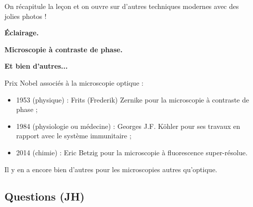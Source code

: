 On récapitule la leçon et on ouvre sur d'autres techniques modernes avec des jolies photos !

\begin{slide}
\textbf{Éclairage.}
\end{slide}

\begin{slide}
\textbf{Microscopie à contraste de phase.}
\end{slide}

\begin{slide}
\textbf{Et bien d'autres...}
\end{slide}

\begin{funfact}
Prix Nobel associés à la microscopie optique :
\begin{itemize}
\item 1953 (physique) : Frits (Frederik) Zernike pour la microscopie à contraste de phase ;
\item 1984 (physiologie ou médecine) : Georges J.F. Köhler pour ses travaux en rapport avec le système immunitaire ;
\item 2014 (chimie) : Eric Betzig pour la microscopie à fluorescence super-résolue.
\end{itemize}
Il y en a encore bien d'autres pour les microscopies autres qu'optique.
\end{funfact}

\subsection*{Questions (JH)}

